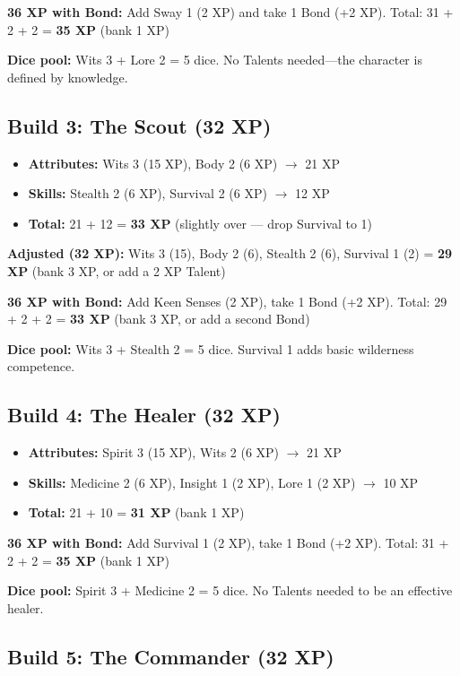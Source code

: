 \textbf{36 XP with Bond:} Add Sway 1 (2 XP) and take 1 Bond (+2 XP). Total: 31 + 2 + 2 = \textbf{35 XP} (bank 1 XP)

\textbf{Dice pool:} Wits 3 + Lore 2 = 5 dice. No Talents needed---the character is defined by knowledge.

\subsection{Build 3: The Scout (32 XP)}

\begin{itemize}
  \item \textbf{Attributes:} Wits 3 (15 XP), Body 2 (6 XP) $\rightarrow$ 21 XP
  \item \textbf{Skills:} Stealth 2 (6 XP), Survival 2 (6 XP) $\rightarrow$ 12 XP
  \item \textbf{Total:} 21 + 12 = \textbf{33 XP} (slightly over — drop Survival to 1)
\end{itemize}

\textbf{Adjusted (32 XP):} Wits 3 (15), Body 2 (6), Stealth 2 (6), Survival 1 (2) = \textbf{29 XP} (bank 3 XP, or add a 2 XP Talent)

\textbf{36 XP with Bond:} Add Keen Senses (2 XP), take 1 Bond (+2 XP). Total: 29 + 2 + 2 = \textbf{33 XP} (bank 3 XP, or add a second Bond)

\textbf{Dice pool:} Wits 3 + Stealth 2 = 5 dice. Survival 1 adds basic wilderness competence.

\subsection{Build 4: The Healer (32 XP)}

\begin{itemize}
  \item \textbf{Attributes:} Spirit 3 (15 XP), Wits 2 (6 XP) $\rightarrow$ 21 XP
  \item \textbf{Skills:} Medicine 2 (6 XP), Insight 1 (2 XP), Lore 1 (2 XP) $\rightarrow$ 10 XP
  \item \textbf{Total:} 21 + 10 = \textbf{31 XP} (bank 1 XP)
\end{itemize}

\textbf{36 XP with Bond:} Add Survival 1 (2 XP), take 1 Bond (+2 XP). Total: 31 + 2 + 2 = \textbf{35 XP} (bank 1 XP)

\textbf{Dice pool:} Spirit 3 + Medicine 2 = 5 dice. No Talents needed to be an effective healer.

\subsection{Build 5: The Commander (32 XP)}

